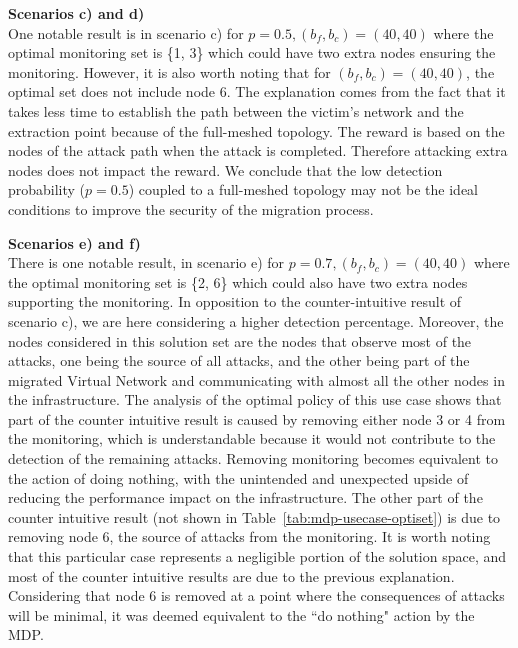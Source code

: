 \textbf{Scenarios c) and d)\\}
One notable result is in scenario c) for $p=0.5,  (b_f,b_c) = (40,40)$ where the optimal monitoring set is \{1, 3\} which could have two extra nodes ensuring the monitoring. However, it is also worth noting that for $(b_f,b_c)=(40,40)$, the optimal set does not include node 6. The explanation comes from the fact that it takes less time to establish the path between the victim's network and the extraction point because of the full-meshed topology. The reward is based on the nodes of the attack path when the attack is completed. Therefore attacking extra nodes does not impact the reward. We conclude that the low detection probability ($p=0.5$) coupled to a full-meshed topology may not be the ideal conditions to improve the security of the migration process.


\textbf{Scenarios e) and f)}\\
There is one  notable result, in scenario e) for $p=0.7,  (b_f,b_c) = (40,40)$ where the optimal monitoring set is \{2, 6\} which could also have two extra nodes supporting the monitoring. In opposition to the counter-intuitive result of scenario c), we are here considering a higher detection percentage. Moreover, the nodes considered in this solution set are the nodes that observe most of the attacks, one being the source of all attacks, and the other being part of the migrated Virtual Network and communicating with almost all the other nodes in the infrastructure. The analysis of the optimal policy of this use case shows that part of the counter intuitive result is caused by removing either node 3 or 4 from the monitoring, which is understandable because it would not contribute to the detection of the remaining attacks. Removing monitoring becomes equivalent to the action of doing nothing, with the unintended and unexpected upside of reducing the performance impact on the infrastructure.
The other part of the counter intuitive result (not shown in Table~\ref{tab:mdp-usecase-optiset}) is due to removing node 6, the source of attacks from the monitoring. It is worth noting that this particular case represents a negligible portion of the solution space, and most of the counter intuitive results are due to the previous explanation. Considering that node 6 is removed at a point where the consequences of attacks will be minimal, it was deemed equivalent to the ``do nothing" action by the MDP.


